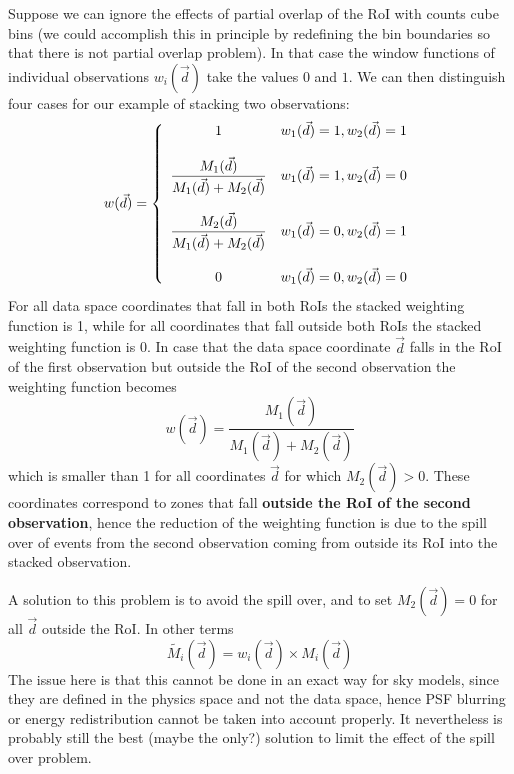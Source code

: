 \documentclass{article}[12pt,a4]
\begin{document}
Suppose we can ignore the effects of partial overlap of the RoI with counts cube bins (we could
accomplish this in principle by redefining the bin boundaries so that there is not partial overlap
problem).
In that case the window functions of individual observations $w_i(\vec{d})$ take the values $0$
and $1$.
We can then distinguish four cases for our example of stacking two observations:
\begin{equation}
w(\vec{d}) = \left \{
   \begin{array}{c l}
      \displaystyle
      1 & w_1(\vec{d})=1, w_2(\vec{d})=1 \\
      \\
     \displaystyle
      \frac{M_1(\vec{d})}{M_1(\vec{d})+M_2(\vec{d})} & w_1(\vec{d})=1, w_2(\vec{d})=0 \\
      \\
     \displaystyle
      \frac{M_2(\vec{d})}{M_1(\vec{d})+M_2(\vec{d})} & w_1(\vec{d})=0, w_2(\vec{d})=1 \\
      \\
     \displaystyle
      0 & w_1(\vec{d})=0, w_2(\vec{d})=0
   \end{array}
   \right .
\label{eq:cases}
\end{equation}
For all data space coordinates that fall in both RoIs the stacked weighting function is 1, while for all
coordinates that fall outside both RoIs the stacked weighting function is 0.
In case that the data space coordinate $\vec{d}$ falls in the RoI of the first observation but outside the 
RoI of the second observation the weighting function becomes
\begin{equation}
w(\vec{d}) = \frac{M_1(\vec{d})}{M_1(\vec{d})+M_2(\vec{d})}
\end{equation}
which is smaller than 1 for all coordinates $\vec{d}$ for which $M_2(\vec{d}) > 0$.
These coordinates correspond to zones that fall {\bf outside the RoI of the second observation},
hence the reduction of the weighting function is due to the spill over of events from the second
observation coming from outside its RoI into the stacked observation.

A solution to this problem is to avoid the spill over, and to set $M_2(\vec{d}) = 0$ for all
$\vec{d}$ outside the RoI.
In other terms
\begin{equation}
\tilde{M_i}(\vec{d}) = w_i(\vec{d}) \times M_i(\vec{d})
\end{equation}
The issue here is that this cannot be done in an exact way for sky models, since they are defined 
in the physics space and not the data space, hence PSF blurring or energy redistribution cannot
be taken into account properly.
It nevertheless is probably still the best (maybe the only?) solution to limit the effect of the spill
over problem.
\end{document}
